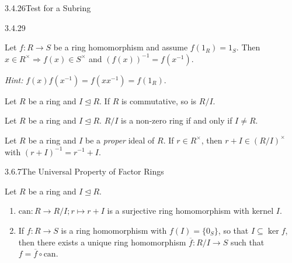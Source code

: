 \documentclass[10pt]{article} %
\newcommand{\Hint}{\vspace{0.2em}\textit{Hint: }}
\begin{document}
\begin{multicols}{3}
\begin{proposition}{3.4.26}{Test for a Subring}
\end{proposition}

\begin{proposition}{3.4.29}{}

    Let $f: R \to S$ be a ring homomorphism and assume $f(1_R)=1_S$. Then $x \in R^{\times} \Rightarrow f(x) \in S^{\times}$ and $(f(x))^{-1} = f(x^{-1})$.

    \Hint $f(x)f(x^{-1}) = f(xx^{-1}) = f(1_R)$.

\end{proposition}

\begin{exercise}{52}{}

    Let $R$ be a ring and $I \unlhd R$. If $R$ is commutative, so is $R/I$.

\end{exercise}

\begin{exercise}{53}{}

    Let $R$ be a ring and $I \unlhd R$. $R/I$ is a non-zero ring if and only if $I \neq R$.

\end{exercise}

\begin{exercise}{54}{}

    Let $R$ be a ring and $I$ be a \emph{proper} ideal of $R$. If $r \in R^{\times}$, then $r + I \in (R/I)^{\times}$ with $(r + I)^{-1} = r^{-1} + I$.

\end{exercise}

\begin{theorem}{3.6.7}{The Universal Property of Factor Rings}

    Let $R$ be a ring and $I \unlhd R$.

        \begin{enumerate}[(1)]
            \setlength{\parskip}{0em}
            \item $\mathrm{can}: R \to R/I; r \mapsto r + I$ is a surjective ring homomorphism with kernel $I$.%
            \item If $f: R \to S$ is a ring homomorphism with $f(I) = \{0_S\}$, so that $I \subseteq \ker{f}$, then there exists a unique ring homomorphism $\overline{f}: R/I \to S$ such that $f = \overline{f} \circ \mathrm{can}$.
        \end{enumerate}


\end{theorem}
\end{multicols}
\end{document}
